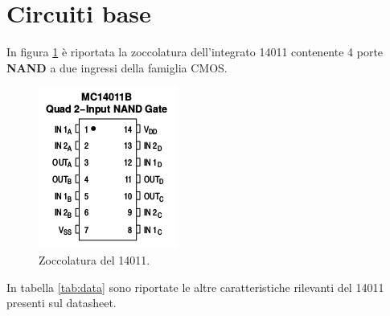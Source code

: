 \documentclass[journal, a4paper]{IEEEtran}
\begin{document}
\section{Circuiti base}

In figura \ref{fig:14011} è riportata la zoccolatura dell'integrato 14011 contenente 4 porte \textbf{NAND} a due ingressi della famiglia CMOS.

\begin{figure}[htp]
\centering
\includegraphics[scale=0.8]{pinscheme}
\caption{Zoccolatura del 14011.}
\label{fig:14011}
\end{figure}

In tabella \ref{tab:data} sono riportate le altre caratteristiche rilevanti del 14011 presenti sul datasheet.
\end{document}
